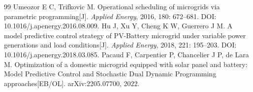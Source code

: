 \begin{thebibliography}{99}
 Umeozor E C, Trifkovic M. Operational scheduling of microgrids via parametric programming[J]. \textit{Applied Energy}, 2016, 180: 672--681. DOI: 10.1016/j.apenergy.2016.08.009.
 Hu J, Xu Y, Cheng K W, Guerrero J M. A model predictive control strategy of PV-Battery microgrid under variable power generations and load conditions[J]. \textit{Applied Energy}, 2018, 221: 195--203. DOI: 10.1016/j.apenergy.2018.03.085.
 Pacaud F, Carpentier P, Chancelier J P, de Lara M. Optimization of a domestic microgrid equipped with solar panel and battery: Model Predictive Control and Stochastic Dual Dynamic Programming approaches[EB/OL]. arXiv:2205.07700, 2022.
\end{thebibliography}
